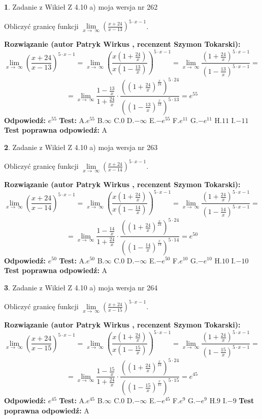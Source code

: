 \documentclass[12pt, a4paper]{article}
\theoremstyle{definition} %
\newtheorem{zad}{}
\newcommand{\zadStart}[1]{\begin{zad}#1\newline}
\newcommand{\zadStop}{\end{zad}}
\newcommand{\rozwStart}[2]{\noindent \textbf{Rozwiązanie (autor #1 , recenzent #2): }\newline}
\newcommand{\rozwStop}{\newline}
\newcommand{\odpStart}{\noindent \textbf{Odpowiedź:}\newline}
\newcommand{\odpStop}{\newline}
\newcommand{\testStart}{\noindent \textbf{Test:}\newline}
\newcommand{\testStop}{\newline}
\newcommand{\kluczStart}{\noindent \textbf{Test poprawna odpowiedź:}\newline}
\newcommand{\kluczStop}{\newline}
\begin{document}
\zadStart{Zadanie z Wikieł Z 4.10 a) moja wersja nr 262}

Obliczyć granicę funkcji  $\lim\limits_{x\to\ \infty}(\frac{x+24}{x-13})^{5\cdot x-1}$.
\zadStop
\rozwStart{Patryk Wirkus}{Szymon Tokarski}
$$\lim\limits_{x\to\ \infty}(\frac{x+24}{x-13})^{5\cdot x-1} = \lim\limits_{x\to\ \infty}(\frac{x(1+\frac{24}{x})}{x(1-\frac{13}{x})})^{5\cdot x-1}=\lim\limits_{x\to\ \infty}\frac{(1+\frac{24}{x})^{5\cdot x-1}}{(1-\frac{13}{x})^{5\cdot x-1}}=$$
$$=\lim\limits_{x\to\ \infty}\frac{1-\frac{13}{x}}{1+\frac{24}{x}}\cdot\frac{((1+\frac{24}{x})^{\frac{x}{24}})^{5\cdot24}}{((1-\frac{13}{x})^{\frac{x}{13}})^{5\cdot13}}=e^{55}$$
\rozwStop
\odpStart
$e^{55}$
\odpStop
\testStart
A.$e^{55}$ B.$\infty$ C.$0$ D.$-\infty$ E.$-e^{55}$
F.$e^{11}$ G.$-e^{11}$
H.$11$
I.$-11$
\testStop
\kluczStart
A
\kluczStop



\zadStart{Zadanie z Wikieł Z 4.10 a) moja wersja nr 263}

Obliczyć granicę funkcji  $\lim\limits_{x\to\ \infty}(\frac{x+24}{x-14})^{5\cdot x-1}$.
\zadStop
\rozwStart{Patryk Wirkus}{Szymon Tokarski}
$$\lim\limits_{x\to\ \infty}(\frac{x+24}{x-14})^{5\cdot x-1} = \lim\limits_{x\to\ \infty}(\frac{x(1+\frac{24}{x})}{x(1-\frac{14}{x})})^{5\cdot x-1}=\lim\limits_{x\to\ \infty}\frac{(1+\frac{24}{x})^{5\cdot x-1}}{(1-\frac{14}{x})^{5\cdot x-1}}=$$
$$=\lim\limits_{x\to\ \infty}\frac{1-\frac{14}{x}}{1+\frac{24}{x}}\cdot\frac{((1+\frac{24}{x})^{\frac{x}{24}})^{5\cdot24}}{((1-\frac{14}{x})^{\frac{x}{14}})^{5\cdot14}}=e^{50}$$
\rozwStop
\odpStart
$e^{50}$
\odpStop
\testStart
A.$e^{50}$ B.$\infty$ C.$0$ D.$-\infty$ E.$-e^{50}$
F.$e^{10}$ G.$-e^{10}$
H.$10$
I.$-10$
\testStop
\kluczStart
A
\kluczStop



\zadStart{Zadanie z Wikieł Z 4.10 a) moja wersja nr 264}

Obliczyć granicę funkcji  $\lim\limits_{x\to\ \infty}(\frac{x+24}{x-15})^{5\cdot x-1}$.
\zadStop
\rozwStart{Patryk Wirkus}{Szymon Tokarski}
$$\lim\limits_{x\to\ \infty}(\frac{x+24}{x-15})^{5\cdot x-1} = \lim\limits_{x\to\ \infty}(\frac{x(1+\frac{24}{x})}{x(1-\frac{15}{x})})^{5\cdot x-1}=\lim\limits_{x\to\ \infty}\frac{(1+\frac{24}{x})^{5\cdot x-1}}{(1-\frac{15}{x})^{5\cdot x-1}}=$$
$$=\lim\limits_{x\to\ \infty}\frac{1-\frac{15}{x}}{1+\frac{24}{x}}\cdot\frac{((1+\frac{24}{x})^{\frac{x}{24}})^{5\cdot24}}{((1-\frac{15}{x})^{\frac{x}{15}})^{5\cdot15}}=e^{45}$$
\rozwStop
\odpStart
$e^{45}$
\odpStop
\testStart
A.$e^{45}$ B.$\infty$ C.$0$ D.$-\infty$ E.$-e^{45}$
F.$e^{9}$ G.$-e^{9}$
H.$9$
I.$-9$
\testStop
\kluczStart
A
\kluczStop
\end{document}
